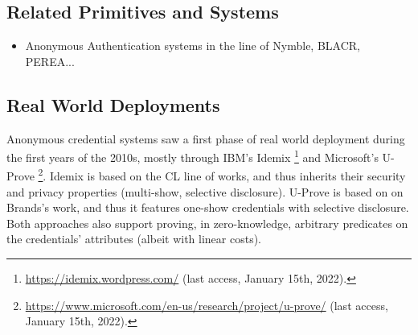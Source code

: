 \subsection{Related Primitives and Systems}
\label{ssec:acrelated}


\begin{itemize}
\item Anonymous Authentication systems in the line of Nymble, BLACR, PEREA...
\end{itemize}

\subsection{Real World Deployments}
\label{ssec:acrealworld}

Anonymous credential systems saw a first phase of real world deployment during
the first years of the 2010s, mostly through IBM's Idemix%
\footnote{\url{https://idemix.wordpress.com/} (last access, January 15th, 2022).}
and Microsoft's U-Prove%
\footnote{\url{https://www.microsoft.com/en-us/research/project/u-prove/} (last
access, January 15th, 2022).}. Idemix is based on the CL line of works, and
thus inherits their security and privacy properties (multi-show, selective
disclosure). U-Prove is based on on Brands's work, and thus it features
one-show credentials with selective disclosure. Both approaches also support
proving, in zero-knowledge, arbitrary predicates on the credentials' attributes
(albeit with linear costs). 

